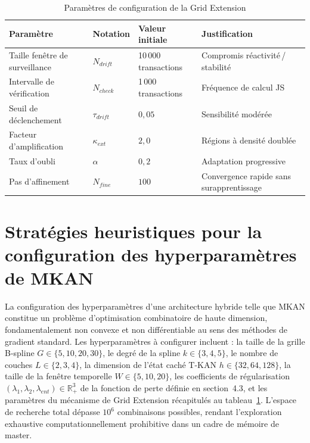 \documentclass[11pt,a4paper,oneside]{report}
\theoremstyle{definition}
\theoremstyle{remark}
\begin{document}
\begin{table}[htbp]
\centering
\small
\caption{Paramètres de configuration de la Grid Extension}
\label{tab:grid_extension_params}
\renewcommand{\arraystretch}{1.5}
\begin{tabular}{@{}
  p{4.2cm}
  p{1.8cm}
  p{2.8cm}
  p{4.2cm}
@{}}
\toprule
\textbf{Paramètre}
  & \textbf{Notation}
  & \textbf{Valeur initiale}
  & \textbf{Justification} \\
\midrule
Taille fenêtre de surveillance
  & $N_{drift}$
  & 10\,000 transactions
  & Compromis réactivité\,/\,stabilité \\
Intervalle de vérification
  & $N_{check}$
  & 1\,000 transactions
  & Fréquence de calcul JS \\
Seuil de déclenchement
  & $\tau_{drift}$
  & $0{,}05$
  & Sensibilité modérée \\
Facteur d'amplification
  & $\kappa_{ext}$
  & $2{,}0$
  & Régions à densité doublée \\
Taux d'oubli
  & $\alpha$
  & $0{,}2$
  & Adaptation progressive \\
Pas d'affinement
  & $N_{fine}$
  & $100$
  & Convergence rapide sans surapprentissage \\
\bottomrule
\end{tabular}
\end{table}

\section{Stratégies heuristiques pour la configuration des hyperparamètres de MKAN}
\label{sec:heuristiques_hyperparams}

La configuration des hyperparamètres d'une architecture hybride telle que MKAN constitue un problème d'optimisation combinatoire de haute dimension, fondamentalement non convexe et non différentiable au sens des méthodes de gradient standard. Les hyperparamètres à configurer incluent : la taille de la grille B-spline $G \in \{5, 10, 20, 30\}$, le degré de la spline $k \in \{3, 4, 5\}$, le nombre de couches $L \in \{2, 3, 4\}$, la dimension de l'état caché T-KAN $h \in \{32, 64, 128\}$, la taille de la fenêtre temporelle $W \in \{5, 10, 20\}$, les coefficients de régularisation $(\lambda_1, \lambda_2, \lambda_{ent}) \in \mathbb{R}^3_+$ de la fonction de perte définie en section~4.3, et les paramètres du mécanisme de Grid Extension récapitulés au tableau~\ref{tab:grid_extension_params}. L'espace de recherche total dépasse $10^6$ combinaisons possibles, rendant l'exploration exhaustive computationnellement prohibitive dans un cadre de mémoire de master.
\end{document}
